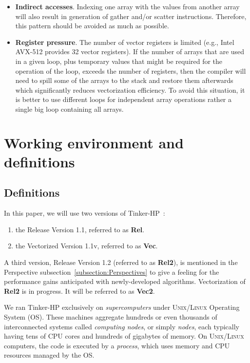 \documentclass[9pt,comparison]{livecoms}
\begin{document}
\begin{itemize}
    \item \textbf{Indirect accesses}. Indexing one array with the values from another array will also result in generation of gather and/or scatter instructions. Therefore, this pattern should be avoided as much as possible.
    \item \textbf{Register pressure}. The number of vector registers is limited (e.g., Intel AVX-512 provides 32 vector registers). If the number of arrays that are used in a given loop, plus temporary values that might be required for the operation of the loop, exceeds the number of registers, then the compiler will need to spill some of the arrays to the stack and restore them afterwards which significantly reduces vectorization efficiency. To avoid this situation, it is better to use different loops for independent array operations rather a single big loop containing all arrays.
\end{itemize}

\section{Working environment and definitions}
\subsection{Definitions} 
\hspace{\parindent} In this paper, we will use two versions of Tinker-HP~: 
\begin{enumerate}
    \item the Release Version 1.1, referred to as \textbf{Rel}.
    \item the Vectorized Version 1.1v, referred to as \textbf{Vec}.
\end{enumerate}

A third version, Release Version 1.2 (referred to as \textbf{Rel2}), is mentioned in the Perspective subsection~\ref{subsection:Perspectives} to give a feeling for the performance gains anticipated with newly-developed algorithms. Vectorization of \textbf{Rel2} is in progress. It will be referred to as \textbf{Vec2}. 

We ran Tinker-HP exclusively on \emph{supercomputers} under \textsc{Unix/Linux} Operating System (OS). These machines aggregate hundreds or even thousands of interconnected systems called \emph{computing nodes}, or simply \emph{nodes}, each typically having tens of CPU cores and hundreds of gigabytes of memory. On \textsc{Unix/Linux} computers, the code is executed by a \emph{process}, which uses memory and CPU resources managed by the OS.
\end{document}
